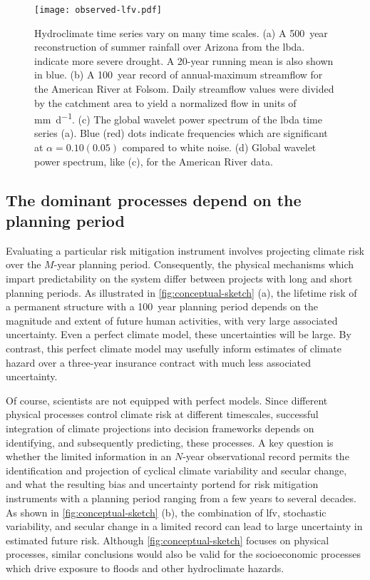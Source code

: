 \documentclass[
  draft,
  linenumbers
]{agujournal2019}
\begin{document}
\begin{figure}
  \centering
  \texttt{[image: observed-lfv.pdf]}
  \caption{
    Hydroclimate time series vary on many time scales.
    (a) A \SI{500}{year} reconstruction of summer rainfall over Arizona from the \acrfull{lbda}.
     indicate more severe drought.
    A 20-year running mean is also shown in blue.
    (b) A \SI{100}{year} record of annual-maximum streamflow for the American River at Folsom.
    Daily streamflow values were divided by the catchment area to yield a normalized flow in units of \si{\milli\meter\per\day}.
    (c) The global wavelet power spectrum of the \gls{lbda} time series (a).
    Blue (red) dots indicate frequencies which are significant at $\alpha=0.10(0.05)$ compared to white noise.
    (d) Global wavelet power spectrum, like (c), for the American River data.
  }\label{fig:observed-lfv}
\end{figure}

\subsection{The dominant processes depend on the planning period}\label{sec:intro-dominant}

Evaluating a particular risk mitigation instrument involves projecting climate risk over the $M$-year planning period.
Consequently, the physical mechanisms which impart predictability on the system differ between projects with long and short planning periods.
As illustrated in \cref{fig:conceptual-sketch} (a), the lifetime risk of a permanent structure with a \SI{100}{year} planning period depends on the magnitude and extent of future human activities, with very large associated uncertainty.
Even   a perfect climate model, these uncertainties will be large.
By contrast, this perfect climate model may usefully inform estimates of climate hazard over a three-year insurance contract with much less associated uncertainty.

Of course, scientists are not equipped with perfect models.
Since different physical processes control climate risk at different timescales, successful integration of climate projections into decision frameworks depends on identifying, and subsequently predicting, these processes.
A key question is whether the limited information in an $N$-year observational record permits the identification and projection of cyclical climate variability and secular change, and what the resulting bias and uncertainty portend for risk mitigation instruments with a planning period ranging from a few years to several decades.
As shown in \cref{fig:conceptual-sketch} (b), the combination of \gls{lfv}, stochastic variability, and secular change in a limited record can lead to large uncertainty in estimated future risk.
Although \cref{fig:conceptual-sketch} focuses on physical processes, similar conclusions would also be valid for the socioeconomic processes which drive exposure to floods and other hydroclimate hazards.
\end{document}
